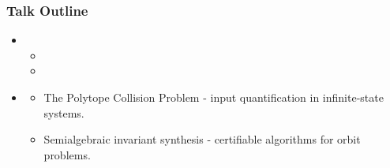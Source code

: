 \begin{frame}
\frametitle{Talk Outline}
\begin{itemize}
\item {}
\begin{itemize} 
    \item {}
	\item {}
\end{itemize}
\item[\itemnow] \textbf{}
\begin{itemize}
\item[\itemlater] The Polytope Collision Problem - input quantification in infinite-state systems.
\item[\itemlater] Semialgebraic invariant synthesis - certifiable algorithms for orbit problems.
\end{itemize}
\end{itemize}
\end{frame}


